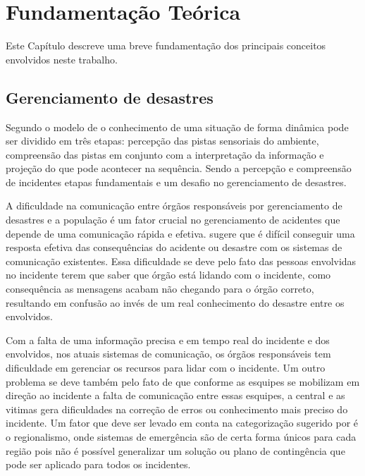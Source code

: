 \documentclass[	12pt, Times, openright, twoside, a4paper, english, brazil]{abntex2}
\begin{document}
\chapter{Fundamentação Teórica}
\label{chapter:funteorica}

Este Capítulo descreve uma breve fundamentação dos principais conceitos envolvidos neste trabalho.

\section{Gerenciamento de desastres}

Segundo o modelo de \cite{endsley} o conhecimento de uma situação de forma dinâmica pode ser dividido em três etapas: percepção das pistas sensoriais do ambiente, compreensão das pistas em conjunto com a interpretação da informação e projeção do que pode acontecer na sequência. Sendo a percepção e compreensão de incidentes etapas fundamentais e um desafio no gerenciamento de desastres.

A dificuldade na comunicação entre órgãos responsáveis por gerenciamento de desastres e a população é um fator crucial no gerenciamento de acidentes que depende de uma comunicação rápida e efetiva. \cite{Chen:2016:CCN:2984356.2984368} sugere que é difícil conseguir uma resposta efetiva das consequências do acidente ou desastre com os sistemas de comunicação existentes. Essa dificuldade se deve pelo fato das pessoas envolvidas no incidente terem que saber que órgão está lidando com o incidente, como consequência as mensagens acabam não chegando para o órgão correto, resultando em confusão ao invés de um real conhecimento do desastre entre os envolvidos. 

Com a falta de uma informação precisa e em tempo real do incidente e dos envolvidos, nos atuais sistemas de comunicação, os órgãos responsáveis tem dificuldade em gerenciar os recursos para lidar com o incidente. Um outro problema se deve também pelo fato de que conforme as esquipes se mobilizam em direção ao incidente a falta de comunicação entre essas esquipes, a central e as vitimas gera dificuldades na correção de erros ou conhecimento mais preciso do incidente. Um fator que deve ser levado em conta na categorização sugerido por \cite{Lorenzi:2013:CBE:2479724.2479739} é o regionalismo, onde sistemas de emergência são de certa forma únicos para cada região pois não é possível generalizar um solução ou plano de contingência que pode ser aplicado para todos os incidentes.
\end{document}

